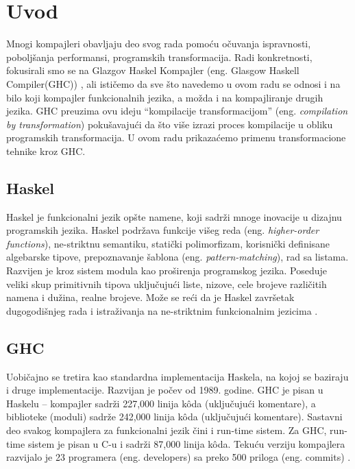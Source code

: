 \section{Uvod}
\label{sec:uvod}

Mnogi kompajleri obavljaju deo svog rada pomoću očuvanja ispravnosti, poboljšanja performansi, programskih transformacija. Radi konkretnosti, fokusirali smo se na Glazgov Haskel Kompajler (eng. Glasgow Haskell Compiler(GHC)) \cite{GHCxx}, ali ističemo da sve što navedemo u ovom radu se odnosi i na bilo koji kompajler funkcionalnih jezika, a možda i na kompajliranje drugih jezika. GHC preuzima ovu ideju “kompilacije transformacijom” (eng. \emph{compilation by transformation}) pokušavajući da što više izrazi proces kompilacije u obliku programskih transformacija. U ovom radu prikazaćemo primenu transformacione tehnike kroz GHC.

\subsection{Haskel}
\label{subsec:podnaslovHaskel}
Haskel je funkcionalni jezik opšte namene, koji sadrži mnoge inovacije u dizajnu programskih jezika. Haskel podržava funkcije višeg reda (eng. \emph{ higher-order functions}), ne-striktnu semantiku, statički polimorfizam, korisnički definisane algebarske tipove, prepoznavanje šablona (eng. \emph{ pattern-matching}), rad sa listama. Razvijen je kroz sistem modula kao proširenja programskog jezika. Poseduje veliki skup primitivnih tipova uključujući liste, nizove, cele brojeve različitih namena i dužina, realne brojeve. Može se reći da je Haskel završetak dugogodišnjeg rada i istraživanja na ne-striktnim funkcionalnim jezicima \cite{Has10}. 

\subsection{GHC}
\label{subsec:podnaslovGHC}

Uobičajno se tretira kao standardna implementacija Haskela, na kojoj se baziraju i druge implementacije. Razvijan je počev od 1989. godine. GHC je pisan u Haskelu – kompajler sadrži 227,000 linija k\^{o}da (uključujući komentare), a biblioteke (moduli) sadrže 242,000 linija k\^{o}da (uključujući komentare).
Sastavni deo svakog kompajlera za funkcionalni jezik čini i run-time sistem. Za GHC, run-time sistem je pisan u C-u i sadrži 87,000 linija k\^{o}da. Tekuću verziju kompajlera razvijalo je 23 programera (eng. developers) sa preko 500 priloga (eng. commits) \cite{StanfordGHC}.  


